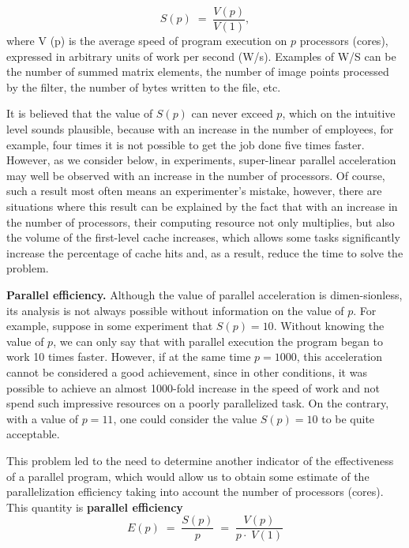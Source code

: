 {	\begin{equation}
		\label{parallelAcceleration:equation}
		S(p)\;=\;\frac{V(p)}{V(1)},
	\end{equation}
	where V (p) is the average speed of program execution on $p$ processors (cores), expressed in arbitrary units of work per second (W/s). Examples of W/S can be the number of summed matrix elements, the number of image points processed by the filter, the number of bytes written to the file, etc.
	\par It is believed that the value of $ S(p)$ can never exceed $p$, which on the intuitive level sounds plausible, because with an increase in the number of employees, for example, four times it is not possible to get the job done five times faster. However, as we consider below, in experiments, super-linear parallel acceleration may well be observed with an increase in the number of processors. Of course, such a result most often means an experimenter's mistake, however, there are situations where this result can be explained by the fact that with an increase in the number of processors, their computing resource not only multiplies, but also the volume of the first-level cache increases, which allows some tasks significantly increase the percentage of cache hits and, as a result, reduce the time to solve the problem.
	\par\textbf{Parallel efficiency.} Although the value of parallel acceleration is dimen-sionless, its analysis is not always possible without information on the value of $p$. For example, suppose in some experiment that $S(p) = 10 $. Without knowing the value of $p$, we can only say that with parallel execution the program began to work 10 times faster. However, if at the same time $ p = 1000 $, this acceleration cannot be considered a good achievement, since in other conditions, it was possible to achieve an almost 1000-fold increase in the speed of work and not spend such impressive resources on a poorly parallelized task. On the contrary, with a value of $ p = 11 $, one could consider the value $ S (p) = 10 $ to be quite acceptable.
	\par This problem led to the need to determine another indicator of the effectiveness of a parallel program, which would allow us to obtain some estimate of the parallelization efficiency taking into account the number of processors (cores). This quantity is
	 \textbf{parallel efficiency}
	\begin{equation}
		\label{parallelEffect:equation}
		E(p)\;=\;\frac{S(p)}p\;=\;\frac{V(p)}{p\cdot\;V(1)}

\end{equation}}
